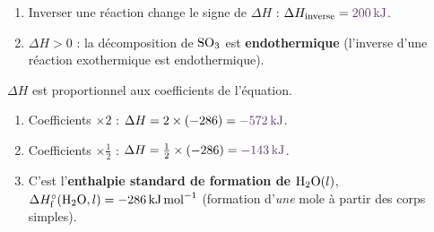 \documentclass[11pt,a4paper]{article}
\newcommand{\dH}{\Delta H}
\newcommand{\dHf}{\Delta H^{\circ}_{\text{f}}}
\newcommand{\rep}[1]{\textcolor{primarydark}{\textbf{#1}}}
\begin{document}
\begin{correction}
\begin{enumerate}[label=\alph*),leftmargin=2em,topsep=2pt,itemsep=2pt]
  \item Inverser une réaction change le signe de $\dH$ : $\dH_{\text{inverse}} = \rep{\SI{+200}{\kilo\joule}}$.
  \item $\dH>0$ : la décomposition de $\ce{SO3}$ est \rep{endothermique} (l'inverse d'une réaction
        exothermique est endothermique).
\end{enumerate}
\end{correction}

\begin{correction}
$\dH$ est proportionnel aux coefficients de l'équation.
\begin{enumerate}[label=\alph*),leftmargin=2em,topsep=2pt,itemsep=2pt]
  \item Coefficients $\times 2$ : $\dH = 2\times(-286) = \rep{\SI{-572}{\kilo\joule}}$.
  \item Coefficients $\times \tfrac12$ : $\dH = \tfrac12\times(-286) = \rep{\SI{-143}{\kilo\joule}}$.
  \item C'est l'\rep{enthalpie standard de formation de $\ce{H2O}(l)$}, $\dHf(\ce{H2O},l)=\SI{-286}{\kilo\joule\per\mol}$
        (formation d'\emph{une} mole à partir des corps simples).
\end{enumerate}
\end{correction}
\end{document}
